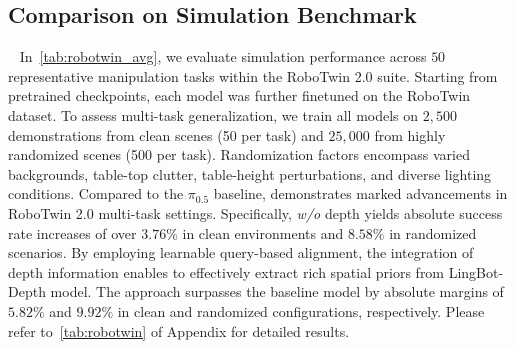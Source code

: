 





\subsection{Comparison on Simulation Benchmark}~\label{sec:sim}
\noindent In~\cref{tab:robotwin_avg}, we evaluate simulation performance across $50$ representative manipulation tasks within the RoboTwin 2.0 suite. Starting from pretrained checkpoints, each model was further finetuned on the RoboTwin dataset. To assess multi-task generalization, we train all models on $2,500$ demonstrations from clean scenes (50 per task) and $25,000$ from highly randomized scenes (500 per task). Randomization factors encompass varied backgrounds, table-top clutter, table-height perturbations, and diverse lighting conditions. Compared to the $\pi_{0.5}$ baseline, \method demonstrates marked advancements in RoboTwin 2.0 multi-task settings. Specifically, \method \textit{w/o} depth yields absolute success rate increases of over $3.76\%$ in clean environments and $8.58\%$ in randomized scenarios.
By employing learnable query-based alignment, the integration of depth information enables \method to effectively extract rich spatial priors from LingBot-Depth model. The approach surpasses the baseline model by absolute margins of $5.82\%$ and $9.92\%$ in clean and randomized configurations, respectively. Please refer to~\cref{tab:robotwin} of Appendix for detailed results. 

